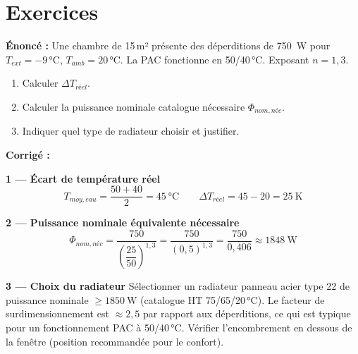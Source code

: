\section{Exercices}

\begin{exercice}[title=Exercice 1 — Sélection d'un radiateur en régime PAC]
\textbf{Énoncé :} Une chambre de 15\,m² présente des déperditions de \SI{750}{\watt} pour $T_{ext} = -9$\,°C, $T_{amb} = 20$\,°C. La PAC fonctionne en 50/40\,°C. Exposant $n = 1{,}3$.

\begin{enumerate}
  \item Calculer $\Delta T_{réel}$.
  \item Calculer la puissance nominale catalogue nécessaire $\Phi_{nom,néc}$.
  \item Indiquer quel type de radiateur choisir et justifier.
\end{enumerate}

\textbf{Corrigé :}

\textbf{1 — Écart de température réel}
\[
  T_{moy,eau} = \frac{50 + 40}{2} = \SI{45}{\celsius}
  \qquad
  \Delta T_{réel} = 45 - 20 = \SI{25}{\kelvin}
\]

\textbf{2 — Puissance nominale équivalente nécessaire}
\[
  \Phi_{nom,néc} = \frac{750}{\left(\dfrac{25}{50}\right)^{1{,}3}}
  = \frac{750}{(0{,}5)^{1{,}3}}
  = \frac{750}{0{,}406}
  \approx \SI{1848}{\watt}
\]

\textbf{3 — Choix du radiateur}
Sélectionner un radiateur panneau acier type 22 de puissance nominale $\geq \SI{1850}{\watt}$ (catalogue HT 75/65/20\,°C). Le facteur de surdimensionnement est $\approx 2{,}5$ par rapport aux déperditions, ce qui est typique pour un fonctionnement PAC à 50/40\,°C. Vérifier l'encombrement en dessous de la fenêtre (position recommandée pour le confort).
\end{exercice}

